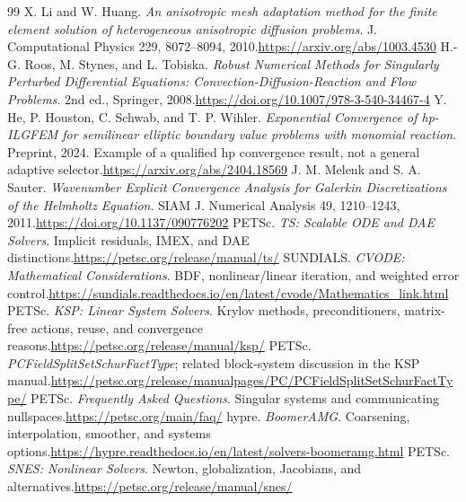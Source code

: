 \documentclass[11pt,a4paper]{article}
\begin{document}
\begin{thebibliography}{99}
 X. Li and W. Huang. \emph{An anisotropic mesh adaptation method for the finite element solution of heterogeneous anisotropic diffusion problems}. J. Computational Physics 229, 8072--8094, 2010.\newline\url{https://arxiv.org/abs/1003.4530}
 H.-G. Roos, M. Stynes, and L. Tobiska. \emph{Robust Numerical Methods for Singularly Perturbed Differential Equations: Convection-Diffusion-Reaction and Flow Problems}. 2nd ed., Springer, 2008.\newline\url{https://doi.org/10.1007/978-3-540-34467-4}
 Y. He, P. Houston, C. Schwab, and T. P. Wihler. \emph{Exponential Convergence of hp-ILGFEM for semilinear elliptic boundary value problems with monomial reaction}. Preprint, 2024. Example of a qualified hp convergence result, not a general adaptive selector.\newline\url{https://arxiv.org/abs/2404.18569}
 J. M. Melenk and S. A. Sauter. \emph{Wavenumber Explicit Convergence Analysis for Galerkin Discretizations of the Helmholtz Equation}. SIAM J. Numerical Analysis 49, 1210--1243, 2011.\newline\url{https://doi.org/10.1137/090776202}
 PETSc. \emph{TS: Scalable ODE and DAE Solvers}. Implicit residuals, IMEX, and DAE distinctions.\newline\url{https://petsc.org/release/manual/ts/}
 SUNDIALS. \emph{CVODE: Mathematical Considerations}. BDF, nonlinear/linear iteration, and weighted error control.\newline\url{https://sundials.readthedocs.io/en/latest/cvode/Mathematics_link.html}
 PETSc. \emph{KSP: Linear System Solvers}. Krylov methods, preconditioners, matrix-free actions, reuse, and convergence reasons.\newline\url{https://petsc.org/release/manual/ksp/}
 PETSc. \emph{PCFieldSplitSetSchurFactType}; related block-system discussion in the KSP manual.\newline\url{https://petsc.org/release/manualpages/PC/PCFieldSplitSetSchurFactType/}
 PETSc. \emph{Frequently Asked Questions}. Singular systems and communicating nullspaces.\newline\url{https://petsc.org/main/faq/}
 hypre. \emph{BoomerAMG}. Coarsening, interpolation, smoother, and systems options.\newline\url{https://hypre.readthedocs.io/en/latest/solvers-boomeramg.html}
 PETSc. \emph{SNES: Nonlinear Solvers}. Newton, globalization, Jacobians, and alternatives.\newline\url{https://petsc.org/release/manual/snes/}

\end{thebibliography}
\end{document}

